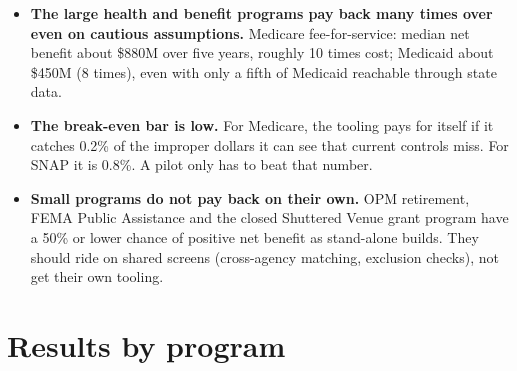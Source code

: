\documentclass[letterpaper,11pt]{article}
\providecommand{\tightlist}{\setlength{\itemsep}{0pt}\setlength{\parskip}{0pt}}
\begin{document}
\begin{itemize}
\tightlist
\item
  \textbf{The large health and benefit programs pay back many times over
  even on cautious assumptions.} Medicare fee-for-service: median net
  benefit about \$880M over five years, roughly 10 times cost; Medicaid
  about \$450M (8 times), even with only a fifth of Medicaid reachable
  through state data.
\item
  \textbf{The break-even bar is low.} For Medicare, the tooling pays for
  itself if it catches 0.2\% of the improper dollars it can see that
  current controls miss. For SNAP it is 0.8\%. A pilot only has to beat
  that number.
\item
  \textbf{Small programs do not pay back on their own.} OPM retirement,
  FEMA Public Assistance and the closed Shuttered Venue grant program
  have a 50\% or lower chance of positive net benefit as stand-alone
  builds. They should ride on shared screens (cross-agency matching,
  exclusion checks), not get their own tooling.
\end{itemize}

\hypertarget{results-by-program}{%
\section*{Results by program}\label{results-by-program}}
\end{document}
